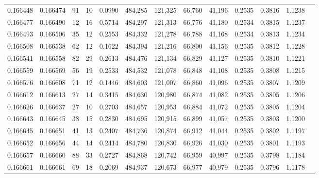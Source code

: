 \begin{tabular}{rrrrrrrrrrrrr}
0.166448 & 0.166474 &    91 &  10 &                                     0.0990 & 484,285 & 121,325 &  66,760 &  41,196 & 0.2535 & 0.3816 & 1.1238 \\
0.166477 & 0.166490 &    12 &  16 &                                     0.5714 & 484,297 & 121,313 &  66,776 &  41,180 & 0.2534 & 0.3815 & 1.1237 \\
0.166493 & 0.166506 &    35 &  12 &                                     0.2553 & 484,332 & 121,278 &  66,788 &  41,168 & 0.2534 & 0.3813 & 1.1234 \\
0.166508 & 0.166538 &    62 &  12 &                                     0.1622 & 484,394 & 121,216 &  66,800 &  41,156 & 0.2535 & 0.3812 & 1.1228 \\
0.166541 & 0.166558 &    82 &  29 &                                     0.2613 & 484,476 & 121,134 &  66,829 &  41,127 & 0.2535 & 0.3810 & 1.1221 \\
0.166559 & 0.166569 &    56 &  19 &                                     0.2533 & 484,532 & 121,078 &  66,848 &  41,108 & 0.2535 & 0.3808 & 1.1215 \\
0.166576 & 0.166608 &    71 &  12 &                                     0.1446 & 484,603 & 121,007 &  66,860 &  41,096 & 0.2535 & 0.3807 & 1.1209 \\
0.166612 & 0.166613 &    27 &  14 &                                     0.3415 & 484,630 & 120,980 &  66,874 &  41,082 & 0.2535 & 0.3805 & 1.1206 \\
0.166626 & 0.166637 &    27 &  10 &                                     0.2703 & 484,657 & 120,953 &  66,884 &  41,072 & 0.2535 & 0.3805 & 1.1204 \\
0.166643 & 0.166645 &    38 &  15 &                                     0.2830 & 484,695 & 120,915 &  66,899 &  41,057 & 0.2535 & 0.3803 & 1.1200 \\
0.166645 & 0.166651 &    41 &  13 &                                     0.2407 & 484,736 & 120,874 &  66,912 &  41,044 & 0.2535 & 0.3802 & 1.1197 \\
0.166652 & 0.166656 &    44 &  14 &                                     0.2414 & 484,780 & 120,830 &  66,926 &  41,030 & 0.2535 & 0.3801 & 1.1193 \\
0.166657 & 0.166660 &    88 &  33 &                                     0.2727 & 484,868 & 120,742 &  66,959 &  40,997 & 0.2535 & 0.3798 & 1.1184 \\
0.166661 & 0.166661 &    69 &  18 &                                     0.2069 & 484,937 & 120,673 &  66,977 &  40,979 & 0.2535 & 0.3796 & 1.1178 \\

\end{tabular}
